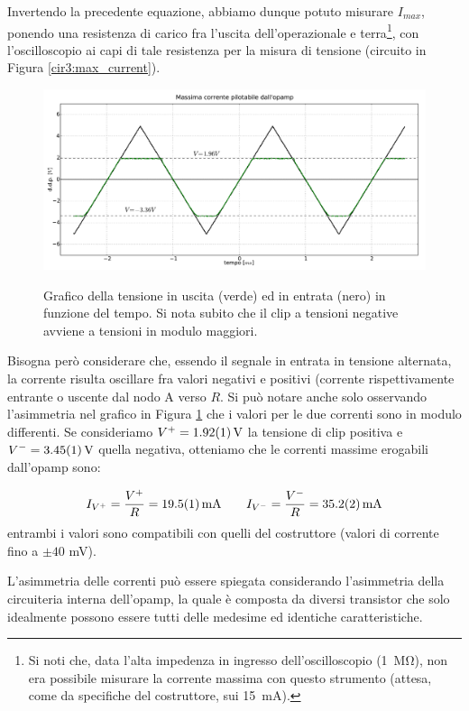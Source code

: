 Invertendo la precedente equazione, abbiamo dunque potuto misurare $I_{max}$, ponendo una resistenza di carico fra l'uscita dell'operazionale e terra\footnote{Si noti che, data l'alta impedenza in ingresso dell'oscilloscopio (\SI{1}{\mega\ohm}), non era possibile misurare la corrente massima con questo strumento (attesa, come da specifiche del costruttore, sui \SI{15}{\milli\ampere}).}, con l'oscilloscopio ai capi di tale resistenza per la misura di tensione (circuito in Figura \ref{cir3:max_current}).

\begin{figure}[ht]
 \centering
   {\includegraphics[width=\textwidth]{../E03/latex/clip.pdf}}
 \caption{Grafico della tensione in uscita (verde) ed in entrata (nero) in funzione del tempo. Si nota subito che il clip a tensioni negative avviene a tensioni in modulo maggiori.}
 \label{gr3:clip}
\end{figure}

Bisogna però considerare che, essendo il segnale in entrata in tensione alternata, la corrente risulta oscillare fra valori negativi e positivi (corrente rispettivamente entrante o uscente dal nodo A verso $R$.
Si può notare anche solo osservando l'asimmetria nel grafico in Figura \ref{gr3:clip} che i valori per le due correnti sono in modulo differenti.
Se consideriamo $V^+ = \SI{1.92 \pm 0.01}{\volt}$ la tensione di clip positiva e $V^- = \SI{3.45 \pm 0.01}{\volt}$ quella negativa, otteniamo che le correnti massime erogabili dall'opamp sono:

$$I_{V^+} = \frac{V^+}{R} = \SI{19.5 \pm 0.1}{\mA}  \qquad I_{V^-} = \frac{V^-}{R} = \SI{35.2 \pm 0.2}{\mA}$$
entrambi i valori sono compatibili con quelli del costruttore (valori di corrente fino a $\pm 40$ \si{\milli\volt}).

L'asimmetria delle correnti può essere spiegata considerando l'asimmetria della circuiteria interna dell'opamp, la quale è composta da diversi transistor che solo idealmente possono essere tutti delle medesime ed identiche caratteristiche.


